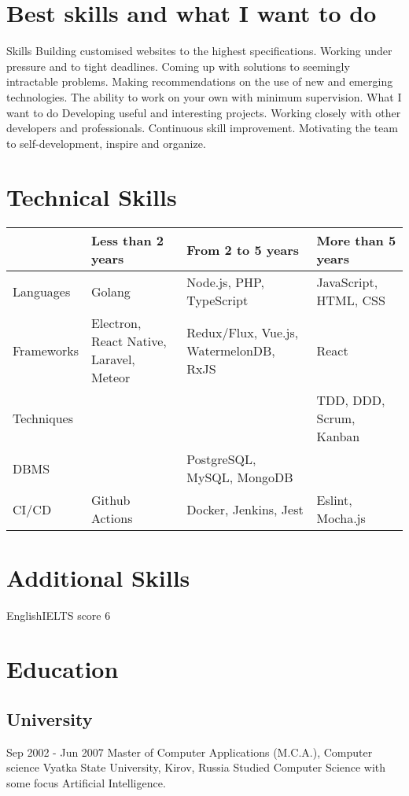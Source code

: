 \documentclass[11pt,a4paper]{moderncv}
\begin{document}
\maketitle
\section{Best skills and what I want to do}
  \cvline
    {Skills}{
      Building customised websites to the highest specifications.
      Working under pressure and to tight deadlines.
      Coming up with solutions to seemingly intractable problems.
      Making recommendations on the use of new and emerging technologies.
      The ability to work on your own with minimum supervision.}
  \cvline
    {What I want to do}{
      Developing useful and interesting projects.
      Working closely with other developers and professionals.
      Continuous skill improvement.
      Motivating the team to self-development, inspire and organize.}

\section{Technical Skills}

\begin{tabular}{ l||m{4cm}|m{4cm}|m{4cm}|  }
  & Less than 2 years & From 2 to 5 years & More than 5 years \\
  \hline\hline
  Languages & Golang & Node.js, PHP, TypeScript & JavaScript, HTML, CSS \\
  \hline
  Frameworks & Electron, React Native, Laravel, Meteor & Redux/Flux, Vue.js, WatermelonDB, RxJS & React \\
  \hline
  Techniques & & & TDD, DDD, Scrum, Kanban \\
  \hline
  DBMS & & PostgreSQL, MySQL, MongoDB & \\
  \hline
  CI/CD & Github Actions & Docker, Jenkins, Jest & Eslint, Mocha.js \\
  \hline
\end{tabular}

\section{Additional Skills}
  \cvline
    {English}{IELTS score 6}

\section{Education}
  \subsection{University}
  \cventry
    {Sep 2002 - Jun 2007}
    {Master of Computer Applications (M.C.A.), Computer science}
    {\newline Vyatka State University, Kirov, Russia}
    {}{}
    {Studied Computer Science with some focus Artificial Intelligence.}
\end{document}
